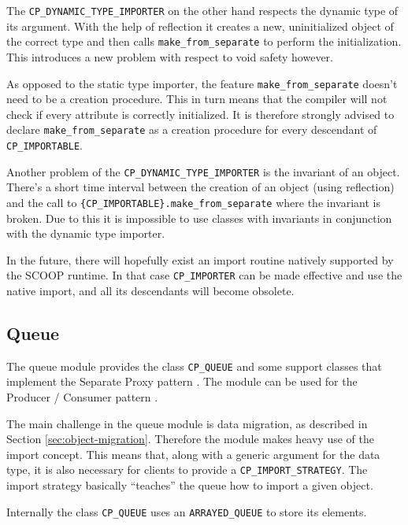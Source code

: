 The \lstinline!CP_DYNAMIC_TYPE_IMPORTER! on the other hand respects the dynamic type of its argument.
With the help of reflection it creates a new, uninitialized object of the correct type and then calls \lstinline!make_from_separate! to perform the initialization.
This introduces a new problem with respect to void safety however.

As opposed to the static type importer, the feature \lstinline!make_from_separate! doesn't need to be a creation procedure.
This in turn means that the compiler will not check if every attribute is correctly initialized.
It is therefore strongly advised to declare \lstinline!make_from_separate! as a creation procedure for every descendant of \lstinline!CP_IMPORTABLE!.

Another problem of the \lstinline!CP_DYNAMIC_TYPE_IMPORTER! is the invariant of an object.
There's a short time interval between the creation of an object (using reflection) and the call to \lstinline!{CP_IMPORTABLE}.make_from_separate! where the invariant is broken.
Due to this it is impossible to use classes with invariants in conjunction with the dynamic type importer.

In the future, there will hopefully exist an import routine natively supported by the SCOOP runtime.
In that case \lstinline!CP_IMPORTER! can be made effective and use the native import, and all its descendants will become obsolete.

\subsection{Queue}

The queue module provides the class \lstinline!CP_QUEUE! and some support classes that implement the Separate Proxy pattern .
The module can be used for the Producer / Consumer pattern .

The main challenge in the queue module is data migration, as described in Section \ref{sec:object-migration}.
Therefore the module makes heavy use of the import concept.
This means that, along with a generic argument for the data type, it is also necessary for clients to provide a \lstinline!CP_IMPORT_STRATEGY!.
The import strategy basically ``teaches'' the queue how to import a given object.

Internally the class \lstinline!CP_QUEUE! uses an \lstinline!ARRAYED_QUEUE! to store its elements.

